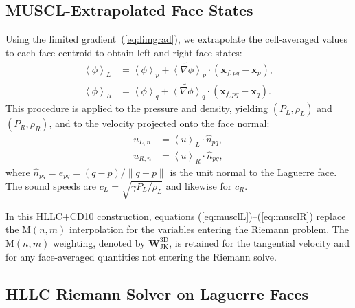 \documentclass[twocolumn]{aastex63}
\newcommand{\vel}{{u}}
\newcommand{\vect}[1]{\mathbf{#1}}
\begin{document}
\subsection{MUSCL-Extrapolated Face States}

Using the limited gradient~(\ref{eq:limgrad}), we extrapolate
the cell-averaged values to each face centroid to obtain
left and right face states:
\begin{align}
  \left<\phi\right>_L &= \left<\phi\right>_p
    + \widetilde{\left<\nabla\phi\right>}_p \cdot
      (\vect{x}_{f,pq} - \vect{x}_p), \label{eq:musclL} \\
  \left<\phi\right>_R &= \left<\phi\right>_q
    + \widetilde{\left<\nabla\phi\right>}_q \cdot
      (\vect{x}_{f,pq} - \vect{x}_q). \label{eq:musclR}
\end{align}
This procedure is applied to the pressure and density,
yielding $(P_L,\rho_L)$ and $(P_R,\rho_R)$, and to the
velocity projected onto the face normal:
\begin{equation}\label{eq:vnorm}
  \begin{aligned}
  \vel_{L,n} &= \left<\vel\right>_L \cdot \hat{n}_{pq},\\
  \vel_{R,n} &= \left<\vel\right>_R \cdot \hat{n}_{pq},
  \end{aligned}
\end{equation}
where $\hat{n}_{pq} = e_{pq} = (q - p)/\|q - p\|$ is the
unit normal to the Laguerre face.
The sound speeds are
$c_L = \sqrt{\gamma P_L / \rho_L}$ and likewise for $c_R$.

In this HLLC+CD10 construction, equations
(\ref{eq:musclL})--(\ref{eq:musclR}) replace the
M$(n,m)$ interpolation for the variables entering the
Riemann problem.
The M$(n,m)$ weighting, denoted by
$\boldsymbol{W}^\text{3D}_\text{JK}$, is retained for the tangential velocity and for any face-averaged
quantities not entering the Riemann solve.


\subsection{HLLC Riemann Solver on Laguerre Faces}
\end{document}
